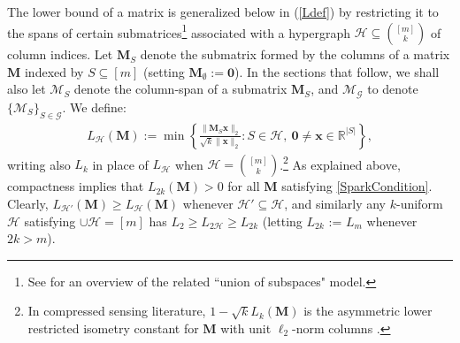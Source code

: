 \documentclass[journal, twocolumn]{IEEEtran}
\begin{document}
The lower bound of a matrix is generalized below in (\ref{Ldef}) by restricting it to the spans of certain submatrices\footnote{See \cite{vidal2005generalized} for an overview of the related ``union of subspaces" model.} associated with a hypergraph $\mathcal{H} \subseteq {[m] \choose k}$ of column indices. Let $\mathbf{M}_S$ denote the submatrix formed by the columns of a matrix $\mathbf{M}$ indexed by $S \subseteq [m]$ (setting $\mathbf{M}_\emptyset := \mathbf{0}$).  In the sections that follow, we shall also let $\bm{\mathcal{M}}_S$ denote the column-span of a submatrix $\mathbf{M}_S$, and $\bm{\mathcal{M}}_\mathcal{G}$ to denote $\{\bm{\mathcal{M}}_S\}_{S \in \mathcal{G}}$.  We define:  %
%
\begin{align}\label{Ldef}
L_\mathcal{H}(\mathbf{M}) := \min \left\{ \frac{\|\mathbf{M}_S\mathbf{x}\|_2}{ \sqrt{k} \|\mathbf{x}\|_2} : S \in \mathcal{H}, \ \mathbf{0} \neq \mathbf{x} \in \mathbb{R}^{|S|} \right\},
\end{align} 
%
writing also $L_{k}$ in place of $L_\mathcal{H}$ when $\mathcal{H} = {[m] \choose k}$.\footnote{In compressed sensing literature, \mbox{$1 - \sqrt{k} L_k(\mathbf{M})$}  is the asymmetric lower restricted isometry constant for $\mathbf{M}$ with unit $\ell_2$-norm columns \cite{Blanchard2011}.}  As explained above, compactness implies that $L_{2k}(\mathbf{M}) > 0$ for all $\mathbf{M}$ satisfying \eqref{SparkCondition}. Clearly, $L_{\mathcal{H}'}(\mathbf{M}) \geq L_\mathcal{H}(\mathbf{M})$ whenever $\mathcal{H}' \subseteq \mathcal{H}$, and similarly any $k$-uniform $\mathcal{H}$ satisfying $\cup \mathcal{H} = [m]$ has $L_2 \geq L_{2\mathcal{H}} \geq L_{2k}$ (letting $L_{2k}$ := $L_m$ whenever $2k > m$).
\end{document}

